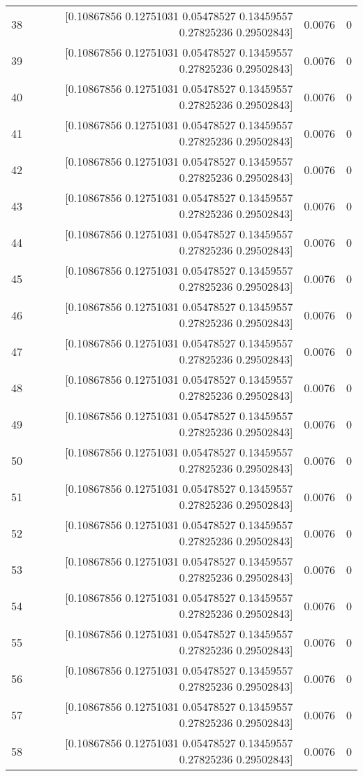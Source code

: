 \begin{longtable}{lrrr}
38 & [0.10867856 0.12751031 0.05478527 0.13459557 0.27825236 0.29502843] & 0.0076 & 0 \\
39 & [0.10867856 0.12751031 0.05478527 0.13459557 0.27825236 0.29502843] & 0.0076 & 0 \\
40 & [0.10867856 0.12751031 0.05478527 0.13459557 0.27825236 0.29502843] & 0.0076 & 0 \\
41 & [0.10867856 0.12751031 0.05478527 0.13459557 0.27825236 0.29502843] & 0.0076 & 0 \\
42 & [0.10867856 0.12751031 0.05478527 0.13459557 0.27825236 0.29502843] & 0.0076 & 0 \\
43 & [0.10867856 0.12751031 0.05478527 0.13459557 0.27825236 0.29502843] & 0.0076 & 0 \\
44 & [0.10867856 0.12751031 0.05478527 0.13459557 0.27825236 0.29502843] & 0.0076 & 0 \\
45 & [0.10867856 0.12751031 0.05478527 0.13459557 0.27825236 0.29502843] & 0.0076 & 0 \\
46 & [0.10867856 0.12751031 0.05478527 0.13459557 0.27825236 0.29502843] & 0.0076 & 0 \\
47 & [0.10867856 0.12751031 0.05478527 0.13459557 0.27825236 0.29502843] & 0.0076 & 0 \\
48 & [0.10867856 0.12751031 0.05478527 0.13459557 0.27825236 0.29502843] & 0.0076 & 0 \\
49 & [0.10867856 0.12751031 0.05478527 0.13459557 0.27825236 0.29502843] & 0.0076 & 0 \\
50 & [0.10867856 0.12751031 0.05478527 0.13459557 0.27825236 0.29502843] & 0.0076 & 0 \\
51 & [0.10867856 0.12751031 0.05478527 0.13459557 0.27825236 0.29502843] & 0.0076 & 0 \\
52 & [0.10867856 0.12751031 0.05478527 0.13459557 0.27825236 0.29502843] & 0.0076 & 0 \\
53 & [0.10867856 0.12751031 0.05478527 0.13459557 0.27825236 0.29502843] & 0.0076 & 0 \\
54 & [0.10867856 0.12751031 0.05478527 0.13459557 0.27825236 0.29502843] & 0.0076 & 0 \\
55 & [0.10867856 0.12751031 0.05478527 0.13459557 0.27825236 0.29502843] & 0.0076 & 0 \\
56 & [0.10867856 0.12751031 0.05478527 0.13459557 0.27825236 0.29502843] & 0.0076 & 0 \\
57 & [0.10867856 0.12751031 0.05478527 0.13459557 0.27825236 0.29502843] & 0.0076 & 0 \\
58 & [0.10867856 0.12751031 0.05478527 0.13459557 0.27825236 0.29502843] & 0.0076 & 0 \\

\end{longtable}
